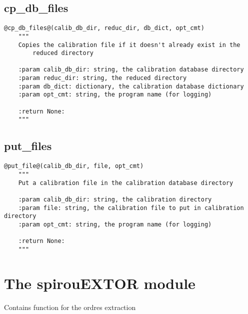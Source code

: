 \subsection{cp\_db\_files}
\begin{lstlisting}[style=pythonstyle]
@cp_db_files@(calib_db_dir, reduc_dir, db_dict, opt_cmt)
    """
    Copies the calibration file if it doesn't already exist in the
        reduced directory

    :param calib_db_dir: string, the calibration database directory
    :param reduc_dir: string, the reduced directory
    :param db_dict: dictionary, the calibration database dictionary
    :param opt_cmt: string, the program name (for logging)

    :return None:
    """
\end{lstlisting}

\subsection{put\_files}
\begin{lstlisting}[style=pythonstyle]
@put_file@(calib_db_dir, file, opt_cmt)
    """
    Put a calibration file in the calibration database directory
    
    :param calib_db_dir: string, the calibration directory 
    :param file: string, the calibration file to put in calibration directory
    :param opt_cmt: string, the program name (for logging)
    
    :return None: 
    """
\end{lstlisting}

\clearpage
\newpage
\section{The spirouEXTOR module}

Contains function for the ordres extraction

